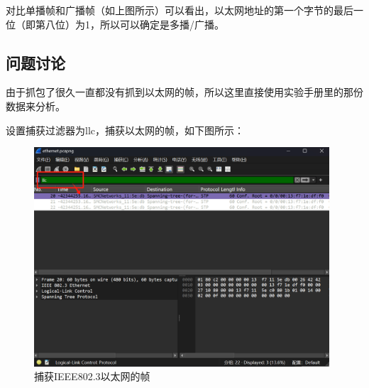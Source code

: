 \documentclass{article}
\begin{document}
	对比单播帧和广播帧（如上图所示）可以看出，以太网地址的第一个字节的最后一位（即第八位）为1，所以可以确定是多播/广播。
	
	\subsection{问题讨论}
	
	由于抓包了很久一直都没有抓到以太网的帧，所以这里直接使用实验手册里的那份数据来分析。
	
	设置捕获过滤器为llc，捕获以太网的帧，如下图所示：
	
	\begin{figure}[H]
		\centering
		\includegraphics[width=11cm]{images/20.捕获IEEE802.3以太网的帧.png}
		\caption{捕获IEEE802.3以太网的帧}
	\end{figure}
	
\end{document}
